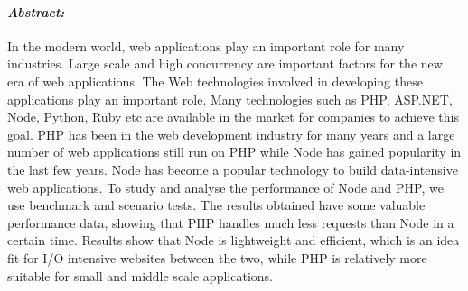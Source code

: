 \documentclass[../thesis.tex]{subfiles}
\begin{document}

\paragraph{\textit{Abstract:}}

In the modern world, web applications play an important role for many industries. Large scale and high concurrency are important factors for the new era of web applications. The Web technologies involved in developing these applications play an important role. Many technologies such as PHP, ASP.NET, Node, Python, Ruby etc are available in the market for companies to achieve this goal. PHP has been in the web development industry for many years and a large number of web applications still run on PHP while Node has gained popularity in the last few years. Node has become a popular technology to build data-intensive web applications. To study and analyse the performance of Node and PHP, we use benchmark and scenario tests. The results obtained have some valuable performance data, showing that PHP handles much less requests than Node in a certain time. Results show that Node is lightweight and efficient, which is an idea fit for I/O intensive websites between the two, while PHP is relatively more suitable for small and middle scale applications.
\end{document}
